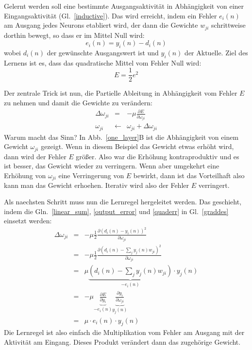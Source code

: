 \documentclass[12pt]{article}
\begin{document}
Gelernt werden soll eine bestimmte Ausgangsaktivität in Abhängigkeit von einer Eingangsaktivität (Gl.~\ref{inductive}).
Das wird erreicht, indem ein Fehler $e_i(n)$ am Ausgang jedes Neurons etabliert wird, der dann die Gewichte $w_{ji}$
schrittweise dorthin bewegt, so dass er im Mittel Null wird:
\begin{equation}
  e_i(n) = y_i(n) - d_i(n) \label{output_error}
\end{equation}
wobei $d_i(n)$ der gewünschte Ausgangswert ist und $y_i(n)$ der Aktuelle.
Ziel des Lernens ist es, dass das quadratische Mittel vom Fehler Null wird:
\begin{equation}
  E = \frac{1}{2} e^2 \label{quaderr}
\end{equation}

Der zentrale Trick ist nun, die Partielle Ableitung in Abhängigkeit vom Fehler $E$ zu nehmen
und damit die Gewichte zu verändern:
\begin{eqnarray}
  \Delta\omega_{ji} & = & - \mu \frac{\partial E}{\partial \omega_{ji}} \label{graddes} \\
  \omega_{ji} & \leftarrow & \omega_{ji} + \Delta\omega_{ji}
\end{eqnarray}
Warum macht das Sinn? In Abb.~\ref{one_layer}B ist die Abhängigkeit von einem Gewicht
$\omega_{ji}$ gezeigt. Wenn in diesem Beispiel das Gewicht etwas erhöht wird, dann
wird der Fehler $E$ größer. Also war die Erhöhung kontraproduktiv und es ist besser,
das Gewicht wieder zu verringern. Wenn aber umgekehrt eine Erhöhung von $\omega_{ji}$ eine
Verringerung von $E$ bewirkt, dann ist das Vorteilhaft also kann man das Gewicht erhoehen.
Iterativ wird also der Fehler $E$ verringert.

Als naechsten Schritt muss nun die Lernregel hergeleitet werden. Das geschieht, indem die
Gln.~\ref{linear_sum}, \ref{output_error} und \ref{quaderr} in Gl.~\ref{graddes} einsetzt werden:
\begin{eqnarray}
  \Delta\omega_{ji}
   & = & - \mu \frac{1}{2} \frac{\partial ( d_i(n) - y_i(n) )^2 }{\partial \omega_{ji}} \\
   & = & - \mu \frac{1}{2} \frac{\partial \left( d_i(n) - \sum_j y_j(n) w_{ji} \right)^2 }{\partial \omega_{ji}} \\
  & = & \mu \underbrace{\left(d_i(n) - \sum_j y_j(n) w_{ji}\right)}_{-e_i(n)} \cdot y_j(n) \\
   & = & - \mu \underbrace{\frac{\partial E}{\partial y_i}}_{-e_i(n)} \underbrace{\frac{\partial y_i}{\partial \omega_{ji}}}_{y_j(n)} \label{chainrule}\\
  & = & \mu \cdot e_i(n) \cdot y_j(n)
\end{eqnarray}
Die Lernregel ist also einfach die Multiplikation vom Fehler am Ausgang mit der Aktivität am Eingang. Dieses Produkt verändert
dann das zugehörige Gewicht.
\end{document}
